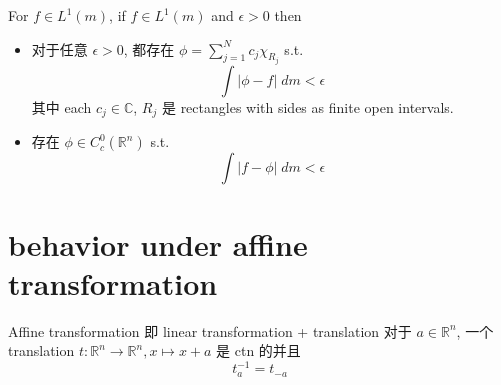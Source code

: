 \documentclass[lang=cn,11pt]{elegantbook}
\begin{document}
\begin{corollary}
For $f \in L^1(m)$, 
    if $f \in L^1 (m)$ and $\epsilon > 0$ then \begin{itemize}
        \item 对于任意 $\epsilon>0$, 都存在 $\phi = \sum_{j=1}^N c_j \chi_{R_j} $ s.t. \[\int |\phi - f|\; dm < \epsilon  \]其中 each $c_j \in \mathbb{C}$, $R_j$ 是 rectangles with sides as finite open intervals.
        \item 存在 $\phi \in C_c^0(\mathbb{R}^n)$ s.t. \[\int |f - \phi| \; dm < \epsilon \]
    \end{itemize}
\end{corollary}





\section{behavior under affine transformation}
Affine transformation 即 linear transformation + translation
对于 $a \in \mathbb{R}^n$, 一个 translation $t: \mathbb{R}^n \to \mathbb{R}^n, x \mapsto x+ a$ 是 ctn 的并且 \[
t_a^{-1} = t_{-a}
\]
\end{document}
